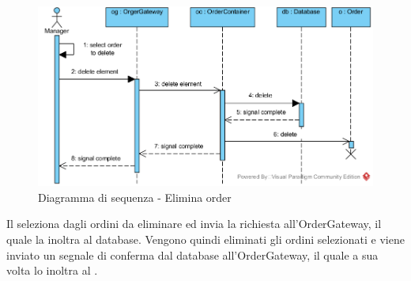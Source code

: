 \begin{figure}[H]
	\centering
	\includegraphics[width=14cm]{diagrammi_img/sequenza/direttore_elimina_orders.png}
	\caption{Diagramma di sequenza - Elimina order}
\end{figure}
Il \Manager{} seleziona dagli ordini da eliminare ed invia la richiesta all'Order\-Gateway, il quale la inoltra al database. Vengono quindi eliminati gli ordini selezionati e viene inviato un segnale di conferma dal database all'Order\-Gateway, il quale a sua volta lo inoltra al \Manager{}.
